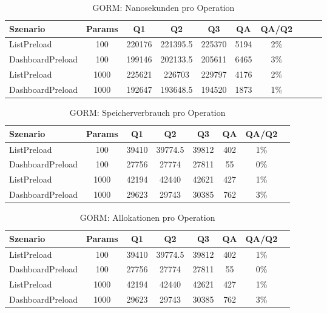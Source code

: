 
\begin{table}[ht]
\centering
\caption{GORM: Nanosekunden pro Operation}
\begin{tabular}{lccccccccc}
\toprule
Szenario & Params & Q1 & Q2 & Q3 & QA & QA/Q2 \\
\midrule
	ListPreload & 100 & 220176 & 221395.5 & 225370 & 5194 & 2\% \\
	DashboardPreload & 100 & 199146 & 202133.5 & 205611 & 6465 & 3\% \\
	ListPreload & 1000 & 225621 & 226703 & 229797 & 4176 & 2\% \\
	DashboardPreload & 1000 & 192647 & 193648.5 & 194520 & 1873 & 1\% \\
\bottomrule
\end{tabular}
\label{tab:benchmark_gorm_nsperop}
\end{table}
	
\begin{table}[ht]
\centering
\caption{GORM: Speicherverbrauch pro Operation}
\begin{tabular}{lccccccc}
\toprule
Szenario & Params & Q1 & Q2 & Q3 & QA & QA/Q2 \\
\midrule
	ListPreload & 100 & 39410 & 39774.5 & 39812 & 402 & 1\% \\
	DashboardPreload & 100 & 27756 & 27774 & 27811 & 55 & 0\% \\
	ListPreload & 1000 & 42194 & 42440 & 42621 & 427 & 1\% \\
	DashboardPreload & 1000 & 29623 & 29743 & 30385 & 762 & 3\% \\
\bottomrule
\end{tabular}
\label{tab:benchmark_gorm_bytesperop}
\end{table}
	
\begin{table}[ht]
\centering
\caption{GORM: Allokationen pro Operation}
\begin{tabular}{lccccccc}
\toprule
Szenario & Params & Q1 & Q2 & Q3 & QA & QA/Q2 \\
\midrule
	ListPreload & 100 & 39410 & 39774.5 & 39812 & 402 & 1\% \\
	DashboardPreload & 100 & 27756 & 27774 & 27811 & 55 & 0\% \\
	ListPreload & 1000 & 42194 & 42440 & 42621 & 427 & 1\% \\
	DashboardPreload & 1000 & 29623 & 29743 & 30385 & 762 & 3\% \\
\bottomrule
\end{tabular}
\label{tab:benchmark_gorm_allocsperop}
\end{table}
	